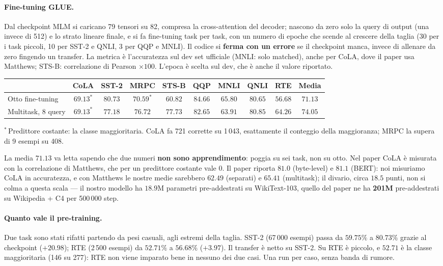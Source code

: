 \documentclass[
  11pt,
]{article}
\begin{document}
\paragraph{Fine-tuning GLUE.} Dal checkpoint MLM si caricano 79 tensori su 82, compresa la cross-attention del decoder; nascono da zero solo la query di output (una invece di 512) e lo strato lineare finale, e si fa fine-tuning task per task, con un numero di epoche che scende al crescere della taglia (30 per i task piccoli, 10 per SST-2 e QNLI, 3 per QQP e MNLI). Il codice si \textbf{ferma con un errore} se il checkpoint manca, invece di allenare da zero fingendo un transfer. La metrica è l'accuratezza sul dev set ufficiale (MNLI: solo matched), anche per CoLA, dove il paper usa Matthews; STS-B: correlazione di Pearson $\times 100$. L'epoca è scelta sul dev, che è anche il valore riportato.

\begin{center}
{\small
\setlength{\tabcolsep}{4pt}
\begin{tabular}{@{}lccccccccc@{}}
\toprule
 & CoLA & SST-2 & MRPC & STS-B & QQP & MNLI & QNLI & RTE & \textbf{Media} \\
\midrule
Otto fine-tuning & $69.13^{*}$ & $80.73$ & $70.59^{*}$ & $60.82$ & $84.66$ & $65.80$ & $80.65$ & $56.68$ & $\mathbf{71.13}$ \\
Multitask, 8 query & $69.13^{*}$ & $77.18$ & $76.72$ & $77.73$ & $82.65$ & $63.91$ & $80.85$ & $64.26$ & $\mathbf{74.05}$ \\
\bottomrule
\end{tabular}
}

{\footnotesize $^{*}$\,Predittore costante: la classe maggioritaria. CoLA fa 721 corrette su 1\,043, esattamente il conteggio della maggioranza; MRPC la supera di 9 esempi su 408.}
\end{center}

La media $71.13$ va letta sapendo che due numeri \textbf{non sono apprendimento}: poggia su sei task, non su otto. Nel paper CoLA è misurata con la correlazione di Matthews, che per un predittore costante vale 0. Il paper riporta $81.0$ (byte-level) e $81.1$ (BERT): noi misuriamo CoLA in accuratezza, e con Matthews le nostre medie sarebbero $62.49$ (separati) e $65.41$ (multitask); il divario, circa $18.5$ punti, non si colma a questa scala --- il nostro modello ha $18.9$M parametri pre-addestrati su WikiText-103, quello del paper ne ha \textbf{201M} pre-addestrati su Wikipedia + C4 per 500\,000 step.

\paragraph{Quanto vale il pre-training.} Due task sono stati rifatti partendo da pesi casuali, agli estremi della taglia. SST-2 (67\,000 esempi) passa da $59.75\%$ a $\mathbf{80.73\%}$ grazie al checkpoint ($+20.98$); RTE (2\,500 esempi) da $52.71\%$ a $56.68\%$ ($+3.97$). Il transfer è netto su SST-2. Su RTE è piccolo, e $52.71$ è la classe maggioritaria (146 su 277): RTE non viene imparato bene in nessuno dei due casi. Una run per caso, senza banda di rumore.
\end{document}
